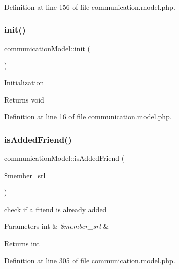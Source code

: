 Definition at line 156 of file communication.\+model.\+php.

\mbox{\label{classcommunicationModel_adff18c028fa89afeb6d7898fde5e2f91}} 
\subsubsection{\texorpdfstring{init()}{init()}}
{\footnotesize\ttfamily communication\+Model\+::init (\begin{DoxyParamCaption}{ }\end{DoxyParamCaption})}

Initialization \begin{DoxyReturn}{Returns}
void 
\end{DoxyReturn}


Definition at line 16 of file communication.\+model.\+php.

\mbox{\label{classcommunicationModel_a47441e7b20018de3fc6ab52bfb9b0d73}} 
\subsubsection{\texorpdfstring{is\+Added\+Friend()}{isAddedFriend()}}
{\footnotesize\ttfamily communication\+Model\+::is\+Added\+Friend (\begin{DoxyParamCaption}\item[{}]{\$member\+\_\+srl }\end{DoxyParamCaption})}

check if a friend is already added 
\begin{DoxyParams}[1]{Parameters}
int & {\em \$member\+\_\+srl} & \\
\hline
\end{DoxyParams}
\begin{DoxyReturn}{Returns}
int 
\end{DoxyReturn}


Definition at line 305 of file communication.\+model.\+php.

\mbox{\label{classcommunicationModel_a4e291316d5021ded0725169ada2a5dda}} 
